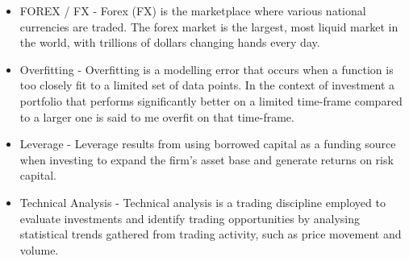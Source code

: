 \documentclass[main.tex]{subfiles}
\begin{document}
\begin{itemize}
\item FOREX / FX - Forex (FX) is the marketplace where various national currencies are traded. The forex market is the largest, most liquid market in the world, with trillions of dollars changing hands every day.
\item Overfitting - Overfitting is a modelling error that occurs when a function is too closely fit to a limited set of data points. In the context of investment a portfolio that performs significantly better on a limited time-frame compared to a larger one is said to me overfit on that time-frame. 
\item Leverage - Leverage results from using borrowed capital as a funding source when
investing to expand the firm's asset base and generate returns on risk
capital.
\item Technical Analysis - Technical analysis is a trading discipline employed to
evaluate investments and identify trading opportunities by analysing
statistical trends gathered from trading activity, such as price
movement and volume. 
\end{itemize}
\end{document}
